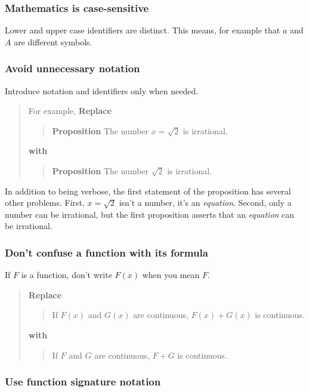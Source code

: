\documentclass[12pt]{article}
\newcounter{ex}\setcounter{ex}{0}
\newcounter{id}\setcounter{id}{0}
\newcounter{se}\setcounter{se}{0}
\begin{document}
 \subsubsection{ Mathematics is case-sensitive}

Lower and upper case identifiers are distinct.  This means, for
example that \(a\) and \(A\) are different symbols.

 \subsubsection{  Avoid unnecessary notation}

Introduce notation and identifiers only when needed. 
\begin{quote}
For example, \textbf{Replace}
\begin{quote}
 \textbf {Proposition} The number \(x = \sqrt{2}\) is irrational.
\end{quote}
\textbf{with}
\begin{quote}
\textbf{Proposition} The number \(\sqrt{2}\) is irrational.
\end{quote}
\end{quote}
In addition to being verbose, the first statement of the 
proposition has several other problems. First, \(x = \sqrt{2}\) isn't 
a number, it's an  {\em equation}. Second, only a number can be 
irrational, but the first proposition asserts that an {\em equation\/}
can be irrational. 

 \subsubsection{  Don't confuse a function with its formula}

If \(F\) is a function, don't write \(F(x)\) when you mean \(F\).

\begin{quote}
\textbf{\textbf{Replace}}
\begin{quote}
If \(F(x) \) and \(G(x)\) are continuous, \(F(x) + G(x)\) is 
continuous.
\end{quote}
\textbf{with}
\begin{quote}
If \(F\) and \(G\) are continuous, \(F + G\) is 
continuous.
\end{quote}
\end{quote}

 \subsubsection{  Use function signature notation}
\end{document}
